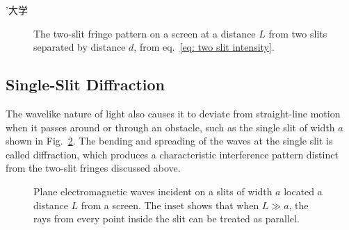 ’大学\documentclass[addpoints]{physlabs}
\begin{document}
\begin{labsection}
\begin{theory}
    \begin{figure}[ht]
        \centering
        \caption{The two-slit fringe pattern on a screen at a distance $L$ from two slits separated by distance $d$, from eq.~\ref{eq: two slit intensity}.}
        \label{fig: two slit intensity}
    \end{figure}

    \subsection*{Single-Slit Diffraction}

    The wavelike nature of light also causes it to deviate from straight-line motion when it passes around or through an obstacle, such as the single slit of width $a$ shown in Fig.~\ref{fig: single slit diffraction}. The bending and spreading of the waves at the single slit is called diffraction, which produces a characteristic interference pattern distinct from the two-slit fringes discussed above.

    \begin{figure}[ht]
        \centering
        \scalebox{0.95}{}
        \caption{Plane electromagnetic waves incident on a slits of width $a$ located a distance $L$ from a screen. The inset shows that when $L\gg a$, the rays from every point inside the slit can be treated as parallel.}
        \label{fig: single slit diffraction}
    \end{figure}


\end{theory}
\end{labsection}
\end{document}
